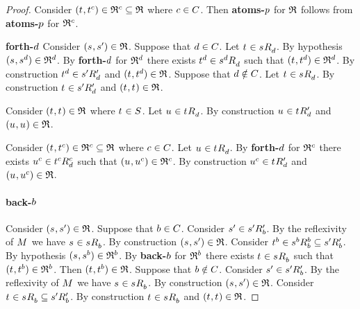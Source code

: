 \begin{proof}
Consider $(\kStateT, \kStateT[\agentC]) \in \refinement^\agentC \subseteq \refinement$ where $\agentC \in \agentsC$.
Then {\bf atoms-$\atomP$} for $\refinement$ follows from {\bf atoms-$\atomP$} for $\refinement^\agentC$.

{\bf forth-$\agentD$}
Consider $(\kStateS, \kStateSP) \in \refinement$.
Suppose that $\agentD \in \agentsC$.
Let $\kStateT \in \kSuccessorsD{\kStateS}$.
By hypothesis $(\kStateS, \kStateS[\agentD]) \in \refinement^\agentD$.
By {\bf forth-$\agentD$} for $\refinement^\agentD$ there exists $\kStateT[\agentD] \in \kSuccessorsD{\kStateS[\agentD]}$ such that $(\kStateT, \kStateT[\agentD]) \in \refinement^\agentD$.
By construction $\kStateT[\agentD] \in \kSuccessorsPD{\kStateSP}$ and $(\kStateT, \kStateT[\agentD]) \in \refinement$.
Suppose that $\agentD \notin \agentsC$.
Let $\kStateT \in \kSuccessorsD{\kStateS}$.
By construction $\kStateT \in \kSuccessorsPD{\kStateSP}$ and $(\kStateT, \kStateT) \in \refinement$.

Consider $(\kStateT, \kStateT) \in \refinement$ where $\kStateT \in \kStates$.
Let $\kStateU \in \kSuccessorsD{\kStateT}$.
By construction $\kStateU \in \kSuccessorsPD{\kStateT}$ and $(\kStateU, \kStateU) \in \refinement$.

Consider $(\kStateT, \kStateT[\agentC]) \in \refinement^\agentC \subseteq \refinement$ where $\agentC \in \agentsC$.
Let $\kStateU \in \kSuccessorsD{\kStateT}$.
By {\bf forth-$\agentD$} for $\refinement^\agentC$ there exists $\kStateU[\agentC] \in \kSuccessorsD[\agentC]{\kStateT[\agentC]}$ such that $(\kStateU, \kStateU[\agentC]) \in \refinement^\agentC$.
By construction $\kStateU[\agentC] \in \kSuccessorsPD{\kStateT}$ and $(\kStateU, \kStateU[\agentC]) \in \refinement$.

\paragraph{back-$\agentB$}
Consider $(\kStateS, \kStateSP) \in \refinement$.
Suppose that $\agentB \in \agentsC$.
Consider $\kStateSP \in \kSuccessorsPB{\kStateSP}$.
By the reflexivity of $\kModel$ we have $\kStateS \in \kSuccessorsB{\kStateS}$.
By construction $(\kStateS, \kStateSP) \in \refinement$.
Consider $\kStateT[\agentB] \in \kSuccessorsB[\agentB]{\kStateS[\agentB]} \subseteq \kSuccessorsPB{\kStateSP}$.
By hypothesis $(\kStateS, \kStateS[\agentB]) \in \refinement^\agentB$.
By {\bf back-$\agentB$} for $\refinement^\agentB$ there exists $\kStateT \in \kSuccessorsB{\kStateS}$ such that $(\kStateT, \kStateT[\agentB]) \in \refinement^\agentB$.
Then $(\kStateT, \kStateT[\agentB]) \in \refinement$.
Suppose that $\agentB \notin \agentsC$.
Consider $\kStateSP \in \kSuccessorsPB{\kStateSP}$.
By the reflexivity of $\kModel$ we have $\kStateS \in \kSuccessorsB{\kStateS}$.
By construction $(\kStateS, \kStateSP) \in \refinement$.
Consider $\kStateT \in \kSuccessorsB{\kStateS} \subseteq \kSuccessorsPB{\kStateSP}$.
By construction $\kStateT \in \kSuccessorsB{\kStateS}$ and $(\kStateT, \kStateT) \in \refinement$.


\end{proof}
